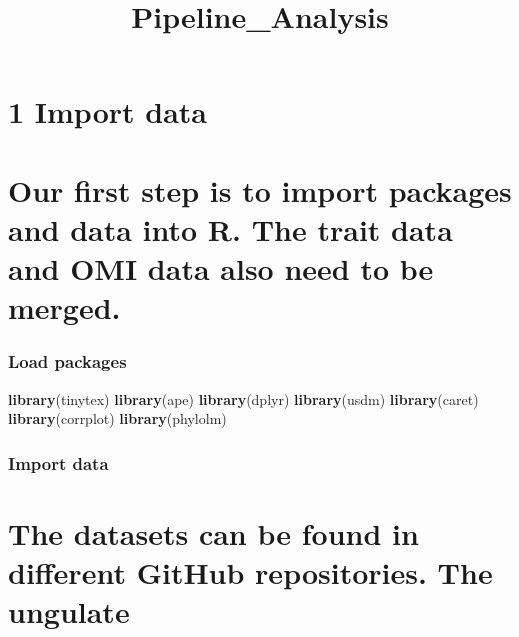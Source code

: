 \documentclass[
]{article}
\title{Pipeline\_Analysis}
\author{}
\date{\vspace{-2.5em}}
\newenvironment{Shaded}{\begin{snugshade}}{\end{snugshade}}
\newcommand{\KeywordTok}[1]{\textcolor[rgb]{0.13,0.29,0.53}{\textbf{#1}}}
\newcommand{\NormalTok}[1]{#1}
\begin{document}
\maketitle

\hypertarget{import-data}{%
\section{1 Import data}\label{import-data}}

\hypertarget{our-first-step-is-to-import-packages-and-data-into-r.-the-trait-data-and-omi-data-also-need-to-be-merged.}{%
\section{Our first step is to import packages and data into R. The trait
data and OMI data also need to be
merged.}\label{our-first-step-is-to-import-packages-and-data-into-r.-the-trait-data-and-omi-data-also-need-to-be-merged.}}

\hypertarget{load-packages}{%
\subsubsection{Load packages}\label{load-packages}}

\begin{Shaded}
\begin{Highlighting}[]
\KeywordTok{library}\NormalTok{(tinytex)}
\KeywordTok{library}\NormalTok{(ape)}
\KeywordTok{library}\NormalTok{(dplyr)}
\KeywordTok{library}\NormalTok{(usdm)}
\KeywordTok{library}\NormalTok{(caret)}
\KeywordTok{library}\NormalTok{(corrplot)}
\KeywordTok{library}\NormalTok{(phylolm)}
\end{Highlighting}
\end{Shaded}

\hypertarget{import-data-1}{%
\subsubsection{Import data}\label{import-data-1}}

\hypertarget{the-datasets-can-be-found-in-different-github-repositories.-the-ungulate}{%
\section{The datasets can be found in different GitHub repositories. The
ungulate}\label{the-datasets-can-be-found-in-different-github-repositories.-the-ungulate}}
\end{document}
